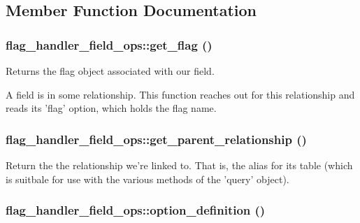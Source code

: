 \subsection{Member Function Documentation}
\hypertarget{classflag__handler__field__ops_378ce25780095e34a818eabe862d61a9}{
\subsubsection[{get\_\-flag}]{\setlength{\rightskip}{0pt plus 5cm}flag\_\-handler\_\-field\_\-ops::get\_\-flag ()}}
\label{classflag__handler__field__ops_378ce25780095e34a818eabe862d61a9}


Returns the flag object associated with our field.

A field is in some relationship. This function reaches out for this relationship and reads its 'flag' option, which holds the flag name. \hypertarget{classflag__handler__field__ops_bd0b18279699026a09a1b8d21142d696}{
\subsubsection[{get\_\-parent\_\-relationship}]{\setlength{\rightskip}{0pt plus 5cm}flag\_\-handler\_\-field\_\-ops::get\_\-parent\_\-relationship ()}}
\label{classflag__handler__field__ops_bd0b18279699026a09a1b8d21142d696}


Return the the relationship we're linked to. That is, the alias for its table (which is suitbale for use with the various methods of the 'query' object). \hypertarget{classflag__handler__field__ops_05750d85d477c51b5fa267a75e245d5a}{
\subsubsection[{option\_\-definition}]{\setlength{\rightskip}{0pt plus 5cm}flag\_\-handler\_\-field\_\-ops::option\_\-definition ()}}
\label{classflag__handler__field__ops_05750d85d477c51b5fa267a75e245d5a}


